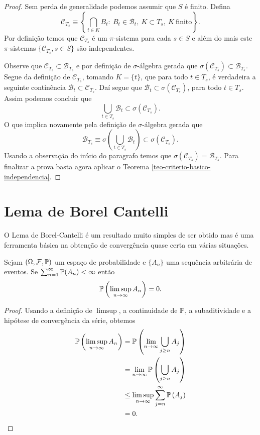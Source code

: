 \begin{proof}
Sem perda de generalidade podemos assumir que $S$ é finito. 
Defina 
	\[
		\mathcal{C}_{T_s}
		\equiv
		\left\{
			\bigcap_{t\in K} B_{t}:\
			B_{t}\in\mathscr{B}_{t},\
			K\subset T_s,\
			K\ \text{finito}
		\right\}.
	\]
Por definição temos que $\mathcal{C}_{T_s}$ é um 
$\pi$-sistema para cada $s\in S$ e além do mais 
este $\pi$-sistemas $\{ \mathcal{C}_{T_s}, s\in S\}$ são independentes.

Observe que $\mathcal{C}_{T_s}\subset \mathscr{B}_{T_s}$ 
e por definição de $\sigma$-álgebra gerada que 
$\sigma(\mathcal{C}_{T_s})\subset \mathscr{B}_{T_s}$.
Segue da definição de $\mathcal{C}_{T_s}$, 
tomando $K=\{t\}$, que
para todo $t\in T_s$, é verdadeira a seguinte continência
$\mathscr{B}_{t}\subset \mathcal{C}_{T_s}$. 
Daí segue que $\mathscr{B}_{t}\subset \sigma(\mathcal{C}_{T_s})$,
para todo $t\in T_s$. 
Assim podemos concluir que 
	\[
		\bigcup_{t\in T_s}\mathscr{B}_{t}
		\subset
		\sigma(\mathcal{C}_{T_s}).
	\]
O que implica novamente pela definição de $\sigma$-álgebra
gerada que
	\[
		\mathscr{B}_{T_s}
		\equiv
		\sigma
		\left(
			\bigcup_{t\in T_s}\mathscr{B}_{t}
		\right)		
		\subset
		\sigma(\mathcal{C}_{T_s}).
	\]
Usando a observação do início do paragrafo temos que 
$\sigma(\mathcal{C}_{T_s}) = \mathscr{B}_{T_s}$. Para finalizar 
a prova basta agora aplicar o 
Teorema \ref{teo-criterio-basico-independencia}.
\end{proof}











\section{Lema de Borel Cantelli}

O Lema de Borel-Cantelli é um resultado muito simples 
de ser obtido mas é uma ferramenta básica na obtenção de 
convergência quase certa em várias situações.

\begin{lema}[Lema de Borel-Cantelli]
Sejam $(\Omega,\F,\P)$ um espaço de probabilidade 
e $\{A_n\}$ uma sequência arbitrária de eventos.
Se $\sum_{n=1}^{\infty} \P(A_n)<\infty$ então 
	\[
		\P\left(\limsup_{n\to\infty} A_n\right)=0.
	\]
\end{lema}




\begin{proof}
Usando a definição de $\limsup$, a continuidade de $\P$,
a subaditividade e a hipótese de convergência da série, 
obtemos
	\begin{align*}
	\P\left(\limsup_{n\to\infty} A_n\right)
	&=
	\P\left( \lim_{n\to\infty} \bigcup_{j\geq n} A_j \right)
	\\
	&=
	\lim_{n\to\infty}\P\left( \bigcup_{j\geq n} A_j \right)
	\\
	&\leq
	\limsup_{n\to\infty} \sum_{j=n}^{\infty}\P\left( A_j \right)
	\\
	&=
	0.
	\end{align*}
\end{proof}



